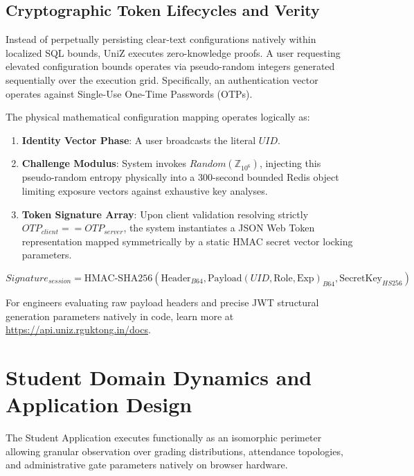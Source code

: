 \documentclass[journal,onecolumn,10pt,draftclsnofoot]{IEEEtran}
\begin{document}
\subsection{Cryptographic Token Lifecycles and Verity}
Instead of perpetually persisting clear-text configurations natively within localized SQL bounds, UniZ executes zero-knowledge proofs. A user requesting elevated configuration bounds operates via pseudo-random integers generated sequentially over the execution grid. Specifically, an authentication vector operates against Single-Use One-Time Passwords (OTPs).

The physical mathematical configuration mapping operates logically as:
\begin{enumerate}
    \item \textbf{Identity Vector Phase}: A user broadcasts the literal $UID$.
    \item \textbf{Challenge Modulus}: System invokes $Random(\mathbb{Z}_{10^6})$, injecting this pseudo-random entropy physically into a $300$-second bounded Redis object limiting exposure vectors against exhaustive key analyses.
    \item \textbf{Token Signature Array}: Upon client validation resolving strictly $OTP_{client} == OTP_{server}$, the system instantiates a JSON Web Token representation mapped symmetrically by a static HMAC secret vector locking parameters.
\end{enumerate}

\begin{equation}
    Signature_{session} = \text{HMAC-SHA256}(\text{Header}_{B64}, \text{Payload}(UID, \text{Role}, \text{Exp})_{B64}, \text{SecretKey}_{HS256})
\end{equation}

For engineers evaluating raw payload headers and precise JWT structural generation parameters natively in code, learn more at \url{https://api.uniz.rguktong.in/docs}.

\newpage

\section{Student Domain Dynamics and Application Design}

The Student Application executes functionally as an isomorphic perimeter allowing granular observation over grading distributions, attendance topologies, and administrative gate parameters natively on browser hardware.
\end{document}

